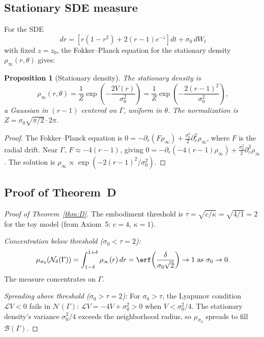 \documentclass[12pt, oneside]{book}
\theoremstyle{plain}
\newtheorem{proposition}[theorem]{Proposition}
\theoremstyle{definition}
\theoremstyle{remark}
\newcommand{\Orb}{\Gamma}
\newcommand{\cN}{\mathcal{N}}
\newcommand{\cB}{\mathcal{B}}
\newcommand{\cL}{\mathcal{L}}
\begin{document}
\subsection{Stationary SDE measure}

For the SDE
\[
  dr = \left[r(1-r^2)+2(r-1)e^{-z}\right]dt + \sigma_0\,dW_t
\]
with fixed $z=z_0$, the Fokker--Planck equation for the stationary
density $\rho_\infty(r,\theta)$ gives:

\begin{proposition}[Stationary density]\label{prop:stationary}
The stationary density is
\[
  \rho_\infty(r,\theta)
  = \frac{1}{Z}\exp\!\left(-\frac{2V(r)}{\sigma_0^2}\right)
  = \frac{1}{Z}\exp\!\left(-\frac{2(r-1)^2}{\sigma_0^2}\right),
\]
a Gaussian in $(r-1)$ centered on $\Orb$, uniform in $\theta$.
The normalization is $Z=\sigma_0\sqrt{\pi/2}\cdot 2\pi$.
\end{proposition}
\begin{proof}
The Fokker--Planck equation is $0=-\partial_r(F\rho_\infty)
+\frac{\sigma_0^2}{2}\partial_r^2\rho_\infty$, where $F$ is the
radial drift. Near $\Orb$, $F\approx -4(r-1)$, giving
$0=-\partial_r(-4(r-1)\rho_\infty)+\frac{\sigma_0^2}{2}\partial_r^2\rho_\infty$.
The solution is $\rho_\infty\propto\exp(-2(r-1)^2/\sigma_0^2)$.
\end{proof}

\subsection{Proof of Theorem~D}

\begin{proof}[Proof of Theorem~\ref{thm:D}]
The embodiment threshold is $\tau=\sqrt{c/\kappa}=\sqrt{4/1}=2$
for the toy model (from Axiom~5: $c=4$, $\kappa=1$).

\emph{Concentration below threshold ($\sigma_0<\tau=2$):}
\[
  \mu_{\sigma_0}(\cN_\delta(\Orb))
  = \int_{1-\delta}^{1+\delta}\rho_\infty(r)\,dr
  = \erf\!\left(\frac{\delta}{\sigma_0\sqrt{2}}\right)\to 1
  \text{ as }\sigma_0\to 0.
\]
The measure concentrates on $\Orb$.

\emph{Spreading above threshold ($\sigma_0>\tau=2$):}
For $\sigma_0>\tau$, the Lyapunov condition $\cL V<0$ fails in
$\cN(\Orb)$: $\cL V=-4V+\sigma_0^2>0$ when $V<\sigma_0^2/4$.
The stationary density's variance $\sigma_0^2/4$ exceeds the
neighborhood radius, so $\mu_{\sigma_0}$ spreads to fill $\cB(\Orb)$.
\end{proof}

\end{document}
